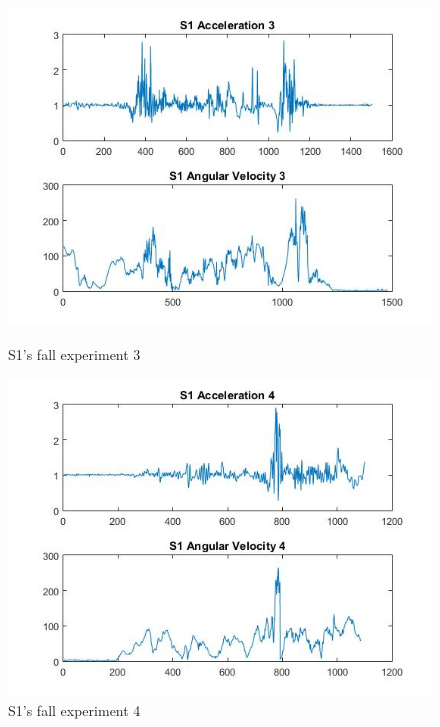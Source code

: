 \documentclass[letterpaper,12pt,titlepage,oneside,final]{book}
\begin{document}
\begin{figure}[h!]
	\centering
	\hspace{-1cm}
	\begin{minipage}[b]{0.5\textwidth}
		\centering
		\includegraphics[scale=0.42]{S1_3}
		\caption{S1's fall experiment 3}
	\end{minipage}%
	\hfill
	\begin{minipage}[b]{0.5\textwidth}
		\centering
		\includegraphics[scale=0.42]{S1_4}
		\caption{S1's fall experiment 4}
	\end{minipage}	
\end{figure}
\end{document}
